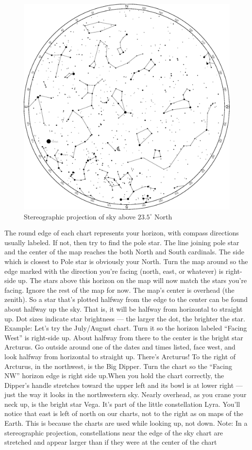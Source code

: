 \documentclass[a4paper,12pt]{extarticle}
\begin{document}
\begin{figure}[H]
    \centering
    \includegraphics[width=0.9\linewidth]{stereo_1.eps}
    \caption{Stereographic projection of sky above $23.5^\circ$ North}
    \label{stereo_2}
\end{figure}

The round edge of each chart represents your horizon, with compass directions usually labeled. If not, then try to find the pole star. The line joining pole star and the center of the map reaches the both North and South cardinals. The side which is closest to Pole star is obviously your North. Turn the map around so the edge marked with the direction you’re facing (north, east, or whatever) is right-side up. The stars above this horizon on the map will now match the stars you’re facing. Ignore the rest of the map for now. The map’s center is overhead (the zenith). So a star that’s plotted halfway from the edge to the center can be found about halfway up the sky. That is, it will be halfway from horizontal to straight up. Dot sizes indicate star brightness — the larger the dot, the brighter the star. Example: Let’s try the July/August chart. Turn it so the horizon labeled “Facing West” is right-side up. About halfway from there to the center is the bright star Arcturus. Go outside around one of the dates and times listed, face west, and look halfway from horizontal to straight up. There’s Arcturus! To the right of Arcturus, in the northwest, is the Big Dipper. Turn the chart so the “Facing NW” horizon edge is right side up.When you hold the chart correctly, the Dipper’s handle stretches toward the upper left and its bowl is at lower right — just the way it looks in the northwestern sky. Nearly overhead, as you crane your neck up, is the bright star Vega. It’s part of the little constellation Lyra. You’ll notice that east is left of north on our charts, not to the right as on maps of the Earth. This is because the charts are used while looking up, not down. Note: In a stereographic projection, constellations near the edge of the sky chart are stretched and appear larger than if they were at the center of the chart\\
\end{document}
